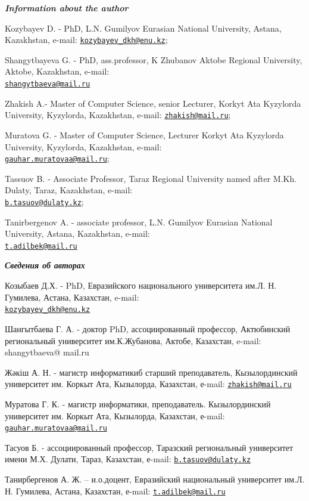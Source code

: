 \begin{authorinfo}
\emph{{\bfseries Information about the author}}

Kozybayev D. - PhD, L.N. Gumilyov Eurasian National University, Astana,
Kazakhstan, e-mail:
\href{mailto:kozybayev_dkh@enu.kz}{\nolinkurl{kozybayev\_dkh@enu.kz}};

Shangytbayeva G. - PhD, ass.professor, K Zhubanov Aktobe Regional
University, Aktobe, Kazakhstan, e-mail:\\
\href{mailto:shangytbaeva@mail.ru}{\nolinkurl{shangytbaeva@mail.ru}}

Zhakish A.- Master of Computer Science, senior Lecturer, Korkyt
Ata Kyzylorda University, Kyzylorda, Kazakhstan, e-mail:
\href{mailto:zhakish@mail.ru}{\nolinkurl{zhakish@mail.ru}};

Muratova G. - Master of Computer Science, Lecturer Korkyt Ata Kyzylorda
University, Kyzylorda, Kazakhstan, e-mail:\\
\href{mailto:gauhar.muratovaa@mail.ru}{\nolinkurl{gauhar.muratovaa@mail.ru}};

Tassuov B. - Associate Professor, Taraz Regional University named after
M.Kh. Dulaty, Taraz, Kazakhstan, e-mail:\\
\href{mailto:b.tasuov@dulaty.kz}{\nolinkurl{b.tasuov@dulaty.kz}};

Tanirbergenov A. - associate professor, L.N. Gumilyov Eurasian National
University, Astana, Kazakhstan, e-mail:\\
\href{mailto:t.adilbek@mail.ru}{\nolinkurl{t.adilbek@mail.ru}}

\emph{{\bfseries Сведения об авторах}}

Козыбаев Д.Х. - PhD, Евразийского национального университета
им.Л. Н. Гумилева, Астана, Казахстан, e-mail:\\
\href{mailto:kozybayev_dkh@enu.kz}{\nolinkurl{kozybayev\_dkh@enu.kz}}

Шангытбаева Г. А. - доктор PhD, ассоциированный профессор,
Актюбинский региональный университет им.К.Жубанова, Актобе, Казахстан,
e-mail: shangytbaeva@ mail.ru

Жәкіш А. Н. - магистр информатикиб старший преподаватель,
Кызылординский университет им. Коркыт Ата, Кызылорда, Казахстан, е-mail:
\href{mailto:zhakish@mail.ru}{\nolinkurl{zhakish@mail.ru}}

Муратова Г. К. - магистр информатики, преподаватель.
Кызылординский университет им. Коркыт Ата, Кызылорда, Казахстан,
е-mail:
\href{mailto:gauhar.muratovaa@mail.ru}{\nolinkurl{gauhar.muratovaa@mail.ru}}

Тасуов Б. - ассоциированный профессор, Таразский региональный
университет имени М.Х. Дулати, Тараз, Казахстан, е-mail:
\href{mailto:b.tasuov@dulaty.kz}{\nolinkurl{b.tasuov@dulaty.kz}}

Танирбергенов А. Ж. -- и.о.доцент, Евразийский национальный университет
им.Л. Н. Гумилева, Астана, Казахстан, е-mail:
\href{mailto:t.adilbek@mail.ru}{\nolinkurl{t.adilbek@mail.ru}}
\end{authorinfo}
